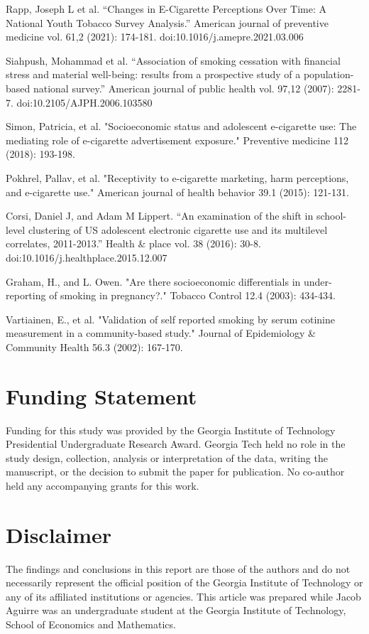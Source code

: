 \documentclass[12pt]{article}
\begin{document}
\begin{thebibliography}{}
Rapp, Joseph L et al. “Changes in E-Cigarette Perceptions Over Time: A National Youth Tobacco Survey Analysis.” American journal of preventive medicine vol. 61,2 (2021): 174-181. doi:10.1016/j.amepre.2021.03.006


Siahpush, Mohammad et al. “Association of smoking cessation with financial stress and material well-being: results from a prospective study of a population-based national survey.” American journal of public health vol. 97,12 (2007): 2281-7. doi:10.2105/AJPH.2006.103580


Simon, Patricia, et al. "Socioeconomic status and adolescent e-cigarette use: The mediating role of e-cigarette advertisement exposure." Preventive medicine 112 (2018): 193-198.

Pokhrel, Pallav, et al. "Receptivity to e-cigarette marketing, harm perceptions, and e-cigarette use." American journal of health behavior 39.1 (2015): 121-131.

Corsi, Daniel J, and Adam M Lippert. “An examination of the shift in school-level clustering of US adolescent electronic cigarette use and its multilevel correlates, 2011-2013.” Health \& place vol. 38 (2016): 30-8. doi:10.1016/j.healthplace.2015.12.007

Graham, H., and L. Owen. "Are there socioeconomic differentials in under-reporting of smoking in pregnancy?." Tobacco Control 12.4 (2003): 434-434.

Vartiainen, E., et al. "Validation of self reported smoking by serum cotinine measurement in a community-based study." Journal of Epidemiology \& Community Health 56.3 (2002): 167-170.

\end{thebibliography}


\section{Funding Statement}
Funding for this study was provided by the Georgia Institute of Technology Presidential Undergraduate Research Award. Georgia Tech held no role in the study design, collection, analysis or interpretation of the data, writing the manuscript, or the decision to submit the paper for publication. No co-author held any accompanying grants for this work. 

\section{Disclaimer}
The findings and conclusions in this report are those of the authors and do not necessarily represent the official position of the Georgia Institute of Technology or any of its affiliated institutions or agencies. This article was prepared while Jacob Aguirre was an undergraduate student at the Georgia Institute of Technology, School of Economics and Mathematics. 
\end{document}
